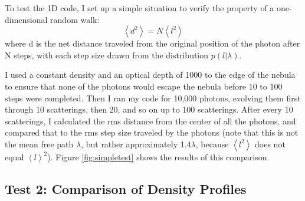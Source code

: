\documentclass{amsart}
\begin{document}
To test the 1D code, I set up a simple situation to verify the property
of a one-dimensional random walk:
\begin{equation}
	\left<d^2\right> = N \left<l^2\right>
\end{equation}
where d is the net distance traveled from the original position of the
photon after N steps, with each step size drawn from the distribution $p(l|\lambda)$.

I used a constant density and an optical depth of 1000 to the edge of
the nebula to ensure that none of the photons would escape the nebula
before 10 to 100 steps were completed.  Then I ran my code for 10,000
photons, evolving them first through 10 scatterings, then 20, and so
on up to 100 scatterings.  After every 10 scatterings, I calculated
the rms distance from the center of all the photons, and compared that
to the rms step size traveled by the photons (note that this is not the
mean free path $\lambda$, but rather approximately 1.4$\lambda$, because
$\left<l^2\right>$ does not equal $\left<l\right>^2$).  Figure \ref{fig:simpletest} shows the results of this comparison.

\subsection{Test 2: Comparison of Density Profiles}
\end{document}
